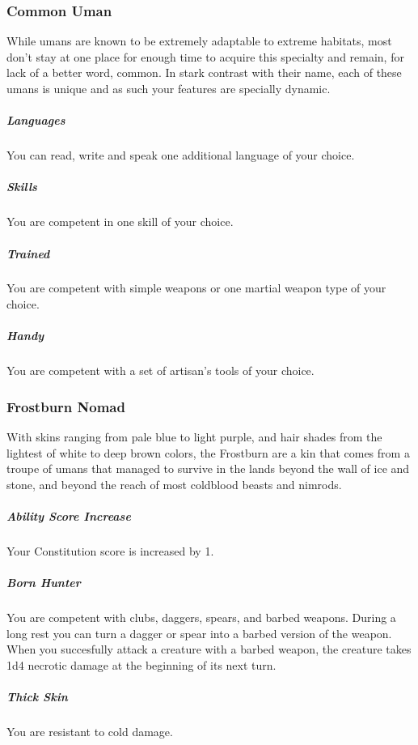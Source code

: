 \subsubsection{Common Uman}
    While umans are known to be extremely adaptable to extreme habitats, most don't stay at one place for enough time to acquire this specialty and remain, for lack of a better word, common.
    In stark contrast with their name, each of these umans is unique and as such your features are specially dynamic.

    \subparagraph{Languages} You can read, write and speak one additional language of your choice.

    \subparagraph{Skills} You are competent in one skill of your choice.

    \subparagraph{Trained} You are competent with simple weapons or one martial weapon type of your choice.

    \subparagraph{Handy} You are competent with a set of artisan's tools of your choice.

\subsubsection{Frostburn Nomad}
    With skins ranging from pale blue to light purple, and hair shades from the lightest of white to deep brown colors, the Frostburn are a kin that comes from a troupe of umans that managed to survive in the lands beyond the wall of ice and stone, and beyond the reach of most coldblood beasts and nimrods.

    \subparagraph{Ability Score Increase} Your Constitution score is increased by 1.


    \subparagraph{Born Hunter} You are competent with clubs, daggers, spears, and barbed weapons.
    During a long rest you can turn a dagger or spear into a barbed version of the weapon.
    When you succesfully attack a creature with a barbed weapon, the creature takes 1d4 necrotic damage at the beginning of its next turn.

    \subparagraph{Thick Skin} %
    You are resistant to cold damage.%

